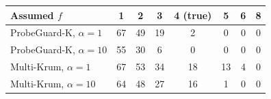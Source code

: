 \begin{tabular}{@{}lccccccc@{}}
\toprule
Assumed $f$ & 1 & 2 & 3 & 4 (true) & 5 & 6 & 8\\
\midrule
ProbeGuard-K, $\alpha{=}1$ & 67 & 49 & 19 & 2 & 0 & 0 & 0\\
ProbeGuard-K, $\alpha{=}10$ & 55 & 30 & 6 & 0 & 0 & 0 & 0\\
Multi-Krum, $\alpha{=}1$ & 67 & 53 & 34 & 18 & 13 & 4 & 0\\
Multi-Krum, $\alpha{=}10$ & 64 & 48 & 27 & 16 & 1 & 0 & 0\\
\bottomrule
\end{tabular}